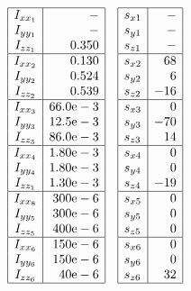 \begin{align*}
  \begin{array}{|c|r|}
  \hline I_{x x_{1}} & - \\
  I_{y y_{1}} & - \\
  I_{z z_{1}} & 0.350 \\
  \hline I_{x x_{2}} & 0.130 \\
  I_{y y_{2}} & 0.524 \\
  I_{z z_{2}} & 0.539 \\
  \hline I_{x x_{3}} & 66.0 \mathrm{e}-3 \\
  I_{y y_{3}} & 12.5 \mathrm{e}-3 \\
  I_{z z_{3}} & 86.0 \mathrm{e}-3 \\
  \hline I_{x x_{4}} & 1.80 \mathrm{e}-3 \\
  I_{y y_{4}} & 1.80 \mathrm{e}-3 \\
  I_{z z_{1}} & 1.30 \mathrm{e}-3 \\
  \hline I_{x x_{8}} & 300 \mathrm{e}-6 \\
  I_{y y_{5}} & 300 \mathrm{e}-6 \\
  I_{z z_{5}} & 400 \mathrm{e}-6 \\
  \hline I_{x x_{6}} & 150 \mathrm{e}-6 \\
  I_{y y_{6}} & 150 \mathrm{e}-6 \\
  I_{z z_{6}} & 40 \mathrm{e}-6 \\
  \hline
  \end{array}
  &&
  \begin{array}{|l|r|}
  \hline s_{x 1} & - \\
  s_{y 1} & - \\
  s_{z 1} & - \\
  \hline s_{x 2} & 68 \\
  s_{y 2} & 6 \\
  s_{z 2} & -16 \\
  \hline s_{x 3} & 0 \\
  s_{y 3} & -70 \\
  s_{z 3} & 14 \\
  \hline s_{x 4} & 0 \\
  s_{y 4} & 0 \\
  s_{z 4} & -19 \\
  \hline s_{x 5} & 0 \\
  s_{y 5} & 0 \\
  s_{z 5} & 0 \\
  \hline s_{x 6} & 0 \\
  s_{y 6} & 0 \\
  s_{z 6} & 32 \\
  \hline
  \end{array}
\end{align*}


